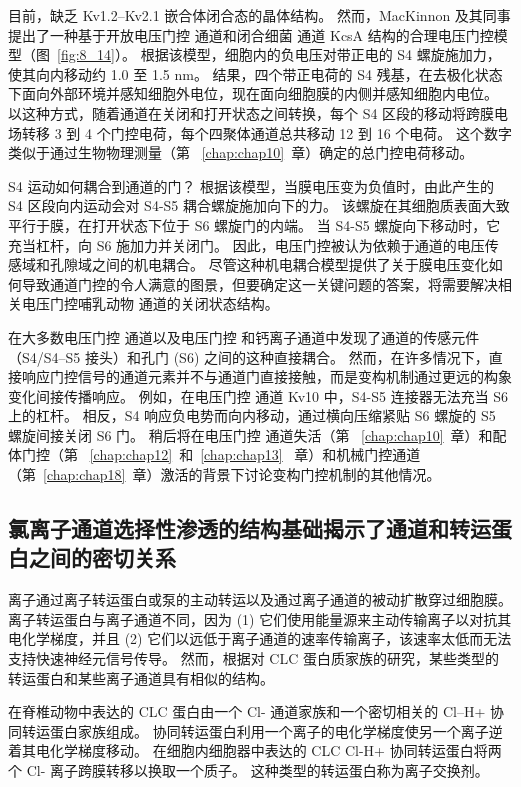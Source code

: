 目前，缺乏 Kv1.2–Kv2.1 嵌合体闭合态的晶体结构。 然而，MacKinnon 及其同事提出了一种基于开放电压门控  通道和闭合细菌  通道 KcsA 结构的合理电压门控模型（图~\ref{fig:8_14}）。
根据该模型，细胞内的负电压对带正电的 S4 螺旋施加力，使其向内移动约 1.0 至 1.5 nm。
结果，四个带正电荷的 S4 残基，在去极化状态下面向外部环境并感知细胞外电位，现在面向细胞膜的内侧并感知细胞内电位。
以这种方式，随着通道在关闭和打开状态之间转换，每个 S4 区段的移动将跨膜电场转移 3 到 4 个门控电荷，每个四聚体通道总共移动 12 到 16 个电荷。 
这个数字类似于通过生物物理测量（第 ~\ref{chap:chap10}~章）确定的总门控电荷移动。


S4 运动如何耦合到通道的门？
根据该模型，当膜电压变为负值时，由此产生的 S4 区段向内运动会对 S4-S5 耦合螺旋施加向下的力。
该螺旋在其细胞质表面大致平行于膜，在打开状态下位于 S6 螺旋门的内端。
当 S4-S5 螺旋向下移动时，它充当杠杆，向 S6 施加力并关闭门。
因此，电压门控被认为依赖于通道的电压传感域和孔隙域之间的机电耦合。
尽管这种机电耦合模型提供了关于膜电压变化如何导致通道门控的令人满意的图景，但要确定这一关键问题的答案，将需要解决相关电压门控哺乳动物  通道的关闭状态结构。


在大多数电压门控  通道以及电压门控  和钙离子通道中发现了通道的传感元件（S4/S4–S5 接头）和孔门 (S6) 之间的这种直接耦合。
然而，在许多情况下，直接响应门控信号的通道元素并不与通道门直接接触，而是变构机制通过更远的构象变化间接传播响应。
例如，在电压门控  通道 Kv10 中，S4-S5 连接器无法充当 S6 上的杠杆。
相反，S4 响应负电势而向内移动，通过横向压缩紧贴 S6 螺旋的 S5 螺旋间接关闭 S6 门。
稍后将在电压门控  通道失活（第 ~\ref{chap:chap10}~章）和配体门控（第 ~\ref{chap:chap12}~和~\ref{chap:chap13}~ 章）和机械门控通道（第~\ref{chap:chap18}~章）激活的背景下讨论变构门控机制的其他情况。



\subsection{氯离子通道选择性渗透的结构基础揭示了通道和转运蛋白之间的密切关系}

离子通过离子转运蛋白或泵的主动转运以及通过离子通道的被动扩散穿过细胞膜。
离子转运蛋白与离子通道不同，因为 (1) 它们使用能量源来主动传输离子以对抗其电化学梯度，并且 (2) 它们以远低于离子通道的速率传输离子，该速率太低而无法支持快速神经元信号传导。
然而，根据对 CLC 蛋白质家族的研究，某些类型的转运蛋白和某些离子通道具有相似的结构。


在脊椎动物中表达的 CLC 蛋白由一个 Cl- 通道家族和一个密切相关的 Cl--H+ 协同转运蛋白家族组成。
协同转运蛋白利用一个离子的电化学梯度使另一个离子逆着其电化学梯度移动。
在细胞内细胞器中表达的 CLC Cl-H+ 协同转运蛋白将两个 Cl- 离子跨膜转移以换取一个质子。
这种类型的转运蛋白称为离子交换剂。


